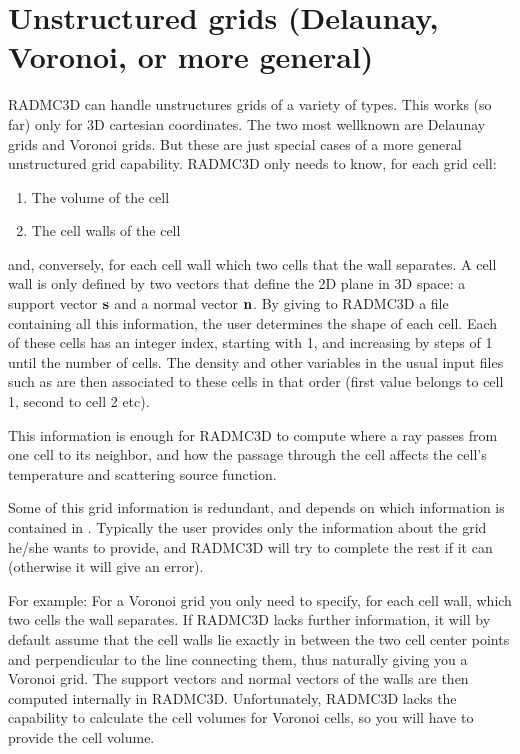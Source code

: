 \documentclass[letterpaper,10pt,english]{sphinxmanual}
\begin{document}
\section{Unstructured grids (Delaunay, Voronoi, or more general)}
\label{\detokenize{gridding:unstructured-grids-delaunay-voronoi-or-more-general}}\label{\detokenize{gridding:sec-unstruct-grids}}
RADMC\sphinxhyphen{}3D can handle unstructures grids of a variety of types. This works (so
far) only for 3\sphinxhyphen{}D cartesian coordinates. The two most well\sphinxhyphen{}known are Delaunay
grids and Voronoi grids. But these are just special cases of a more general
unstructured grid capability. RADMC\sphinxhyphen{}3D only needs to know, for each grid cell:
\begin{enumerate}
%
\item {} 
The volume of the cell

\item {} 
The cell walls of the cell

\end{enumerate}

and, conversely, for each cell wall which two cells that the wall separates.  A
cell wall is only defined by two vectors that define the 2D plane in 3D space: a
support vector \({\bf s}\) and a normal vector \({\bf n}\). By giving to
RADMC\sphinxhyphen{}3D a file  containing all this information, the user determines
the shape of each cell. Each of these cells has an integer index, starting with
1, and increasing by steps of 1 until the number of cells. The density and other
variables in the usual input files such as  are then associated
to these cells in that order (first value belongs to cell 1, second to cell 2 etc).

This information is enough for RADMC\sphinxhyphen{}3D to compute where a ray passes from one
cell to its neighbor, and how the passage through the cell affects the cell’s
temperature and scattering source function.

Some of this grid information is redundant, and depends on which information
is contained in . Typically the user provides only the information
about the grid he/she wants to provide, and RADMC\sphinxhyphen{}3D will try to complete the rest
if it can (otherwise it will give an error).

For example: For a Voronoi grid you only need to specify, for each cell wall,
which two cells the wall separates. If RADMC\sphinxhyphen{}3D lacks further information, it
will by default assume that the cell walls lie exactly in between the two cell
center points and perpendicular to the line connecting them, thus naturally
giving you a Voronoi grid. The support vectors and normal vectors of the walls are then
computed internally in RADMC\sphinxhyphen{}3D. Unfortunately, RADMC\sphinxhyphen{}3D lacks the capability to
calculate the cell volumes for Voronoi cells, so you will have to provide the
cell volume.
\end{document}
